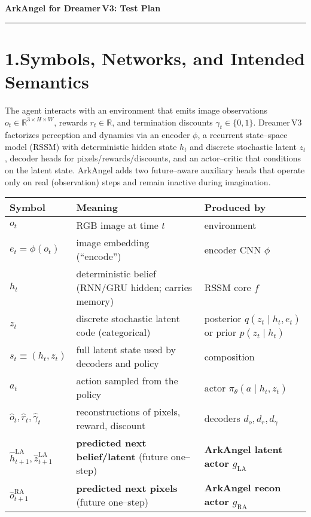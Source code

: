 \documentclass[11pt]{article}
\begin{document}
{\LARGE \textbf{ArkAngel for Dreamer\,V3: Test Plan}}\\[0.5em]

\hrule

\section*{1.\quad Symbols, Networks, and Intended Semantics}

The agent interacts with an environment that emits image observations $o_t\in\mathbb{R}^{3\times H\times W}$, rewards $r_t\in\mathbb{R}$, and termination discounts $\gamma_t\in\{0,1\}$. Dreamer\,V3 factorizes perception and dynamics via an encoder $\phi$, a recurrent state--space model (RSSM) with deterministic hidden state $h_t$ and discrete stochastic latent $z_t$, decoder heads for pixels/rewards/discounts, and an actor--critic that conditions on the latent state. ArkAngel adds two future--aware auxiliary heads that operate only on real (observation) steps and remain inactive during imagination.

\begin{center}
\renewcommand{\arraystretch}{1.25}
\begin{tabular}{@{}L{2.6cm} L{10.7cm} L{2.7cm}@{}}
\toprule
\textbf{Symbol} & \textbf{Meaning} & \textbf{Produced by} \\
\midrule
$o_t$ & RGB image at time $t$ & environment \\
$e_t=\phi(o_t)$ & image embedding (``encode'') & encoder CNN $\phi$ \\
$h_t$ & deterministic belief (RNN/GRU hidden; carries memory) & RSSM core $f$ \\
$z_t$ & discrete stochastic latent code (categorical) & posterior $q(z_t\!\mid h_t,e_t)$ or prior $p(z_t\!\mid h_t)$ \\
$s_t\equiv(h_t,z_t)$ & full latent state used by decoders and policy & composition \\
$a_t$ & action sampled from the policy & actor $\pi_\theta(a\!\mid h_t,z_t)$ \\
$\hat o_t,\hat r_t,\hat\gamma_t$ & reconstructions of pixels, reward, discount & decoders $d_o,d_r,d_\gamma$ \\
$\hat h_{t+1}^{\mathrm{LA}},\hat z_{t+1}^{\mathrm{LA}}$ & \textbf{predicted next belief/latent} (future one--step) & \textbf{ArkAngel latent actor $g_{\mathrm{LA}}$} \\
$\hat o_{t+1}^{\mathrm{RA}}$ & \textbf{predicted next pixels} (future one--step) & \textbf{ArkAngel recon actor $g_{\mathrm{RA}}$} \\
\bottomrule
\end{tabular}
\end{center}
\end{document}
